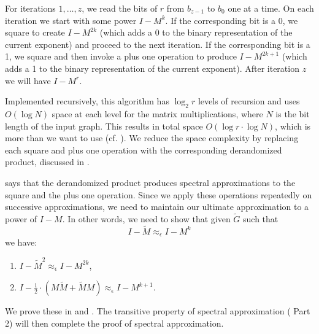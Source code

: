 \documentclass{toc}
\newcommand{\wt}{\widetilde}   %
\numberwithin{myalgctr}{section}
\theoremstyle{named}
\begin{document}
For iterations $1,\ldots, z$, we read the bits of $r$ from $b_{z-1}$ to $b_{0}$ one at a time. On each iteration we start with some power $I-M^k$. If the corresponding bit is a 0, we square to create $I-M^{2k}$ (which adds a 0 to the binary representation of the current exponent) and proceed to the next iteration. If the corresponding bit is a 1, we square and then invoke a plus one operation to produce $I-M^{2k+1}$ (which adds a 1 to the binary representation of the current exponent). After iteration $z$ we will have $I-M^r$.

Implemented recursively, this algorithm has $\log_2 r$ levels of recursion and uses $O(\log N)$ space at each level for the matrix multiplications, where $N$ is the bit length of the input graph. This results in total space $O(\log r\cdot \log N)$, which is more than we want to use (cf. ). We reduce the space complexity by replacing each square and plus one operation with the corresponding derandomized product, discussed in . 

 says that the derandomized product produces spectral approximations to the square and the plus one operation. Since we apply these operations repeatedly on successive approximations, we need to maintain our ultimate approximation to a power of $I-M$. In other words, we need to show that given $\wt{G}$ such that
\[
  I-\wt{M}\approx_{\epsilon}I-M^k
\]
we have:
\begin{enumerate}
\item $I-\wt{M}^2 \approx_{\epsilon} I-M^{2k}$,
\item $I-\frac{1}{2}\cdot(M\wt{M}+\wt{M}M)\approx_{\epsilon} I-M^{k+1}$.
\end{enumerate}
We prove these in  and . The transitive property of spectral approximation ( Part 2) will then complete the proof of spectral approximation. 
\end{document}
